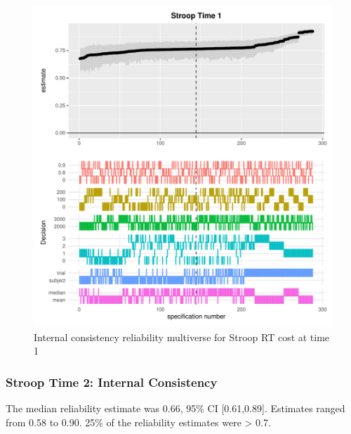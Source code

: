 \documentclass[
  man,floatsintext]{apa6}
\begin{document}
\begin{figure}
\centering
\includegraphics{Reliability_Multiverse_files/figure-latex/unnamed-chunk-5-1.pdf}
\caption{\label{fig:unnamed-chunk-5}Internal consistency reliability multiverse for Stroop RT cost at time 1}
\end{figure}

\newpage

\hypertarget{stroop-time-2-internal-consistency}{%
\subsubsection{Stroop Time 2: Internal Consistency}\label{stroop-time-2-internal-consistency}}

The median reliability estimate was 0.66, 95\% CI {[}0.61,0.89{]}. Estimates ranged from 0.58 to 0.90. 25\% of the reliability estimates were \textgreater{} 0.7.
\end{document}
